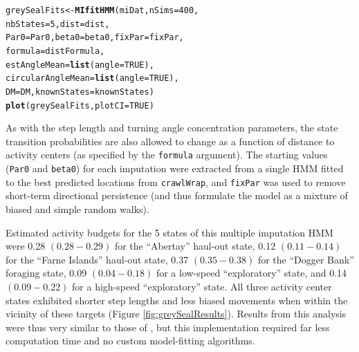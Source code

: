 \documentclass[12pt]{article}\usepackage[]{graphicx}\usepackage[]{color}
\makeatletter
\newcommand{\hlnum}[1]{\textcolor[rgb]{0.686,0.059,0.569}{#1}}%
\newcommand{\hlstd}[1]{\textcolor[rgb]{0.345,0.345,0.345}{#1}}%
\newcommand{\hlkwb}[1]{\textcolor[rgb]{0.69,0.353,0.396}{#1}}%
\newcommand{\hlkwc}[1]{\textcolor[rgb]{0.333,0.667,0.333}{#1}}%
\newcommand{\hlkwd}[1]{\textcolor[rgb]{0.737,0.353,0.396}{\textbf{#1}}}%
\newenvironment{kframe}{%
 \def\at@end@of@kframe{}%
 \ifinner\ifhmode%
  \def\at@end@of@kframe{\end{minipage}}%
  \begin{minipage}{\columnwidth}%
 \fi\fi%
 \def\FrameCommand##1{\hskip\@totalleftmargin \hskip-\fboxsep
 \colorbox{shadecolor}{##1}\hskip-\fboxsep
     \hskip-\linewidth \hskip-\@totalleftmargin \hskip\columnwidth}%
 \MakeFramed {\advance\hsize-\width
   \@totalleftmargin\z@ \linewidth\hsize
   \@setminipage}}%
 {\par\unskip\endMakeFramed%
 \at@end@of@kframe}
\newenvironment{knitrout}{}{} %
\makeatother
\begin{document}
\begin{knitrout}
\color{fgcolor}\begin{kframe}
\begin{alltt}
\hlstd{greySealFits} \hlkwb{<-} \hlkwd{MIfitHMM}\hlstd{(miDat,} \hlkwc{nSims} \hlstd{=} \hlnum{400}\hlstd{,}
                         \hlkwc{nbStates} \hlstd{=} \hlnum{5}\hlstd{,} \hlkwc{dist} \hlstd{= dist,}
                         \hlkwc{Par0} \hlstd{= Par0,} \hlkwc{beta0} \hlstd{= beta0,} \hlkwc{fixPar} \hlstd{= fixPar,}
                         \hlkwc{formula} \hlstd{= distFormula,}
                         \hlkwc{estAngleMean} \hlstd{=} \hlkwd{list}\hlstd{(}\hlkwc{angle}\hlstd{=}\hlnum{TRUE}\hlstd{),}
                         \hlkwc{circularAngleMean} \hlstd{=} \hlkwd{list}\hlstd{(}\hlkwc{angle}\hlstd{=}\hlnum{TRUE}\hlstd{),}
                         \hlkwc{DM} \hlstd{= DM,} \hlkwc{knownStates} \hlstd{= knownStates)}
\hlkwd{plot}\hlstd{(greySealFits,} \hlkwc{plotCI} \hlstd{=} \hlnum{TRUE}\hlstd{)}
\end{alltt}
\end{kframe}
\end{knitrout}
As with the step length and turning angle concentration parameters, the state transition probabilities are also allowed to change as a function of distance to activity centers (as specified by the \verb|formula| argument). The starting values (\verb|Par0| and \verb|beta0|) for each imputation were extracted from a single HMM fitted to the best predicted locations from \verb|crawlWrap|, and \verb|fixPar| was used to remove short-term directional persistence (and thus formulate the model as a mixture of biased and simple random walks). 

Estimated activity budgets for the 5 states of this multiple imputation HMM were 0.28 $(0.28-0.29)$ for the ``Abertay'' haul-out state, 0.12 $(0.11-0.14)$ for the ``Farne Islands'' haul-out state, 0.37 $(0.35-0.38)$ for the ``Dogger Bank'' foraging state, 0.09 $(0.04-0.18)$ for a low-speed ``exploratory'' state, and 0.14 $(0.09-0.22)$ for a high-speed ``exploratory'' state. All three activity center states exhibited shorter step lengths and less biased movements when within the vicinity of these targets (Figure \ref{fig:greySealResults}). Results from this analysis were thus very similar to those of \cite{McClintockEtAl2012}, but this implementation required far less computation time and no custom model-fitting algorithms. 
\end{document}

